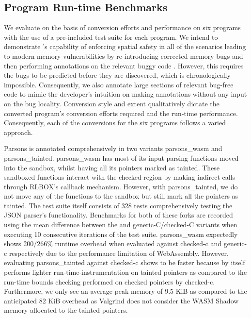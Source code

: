 \subsection{Program Run-time Benchmarks}
We evaluate \systemname on the basis of conversion efforts and performance on six programs with the use of a pre-included test suite for each program. We intend to demonstrate \systemname's capability of enforcing spatial safety in all of the scenarios leading to modern memory vulnerabilities by re-introducing corrected memory bugs and then performing \systemname annotations on the relevant buggy code . However, this requires the bugs to be predicted before they are discovered, which is chronologically impossible. Consequently, we also annotate large sections of relevant bug-free code to mimic the developer's intuition on making \systemname annotations without any input on the bug locality. Conversion style and extent qualitatively dictate the converted program's conversion efforts required and the run-time performance. Consequently, each of the conversions for the six programs follows a varied approach. 

Parsons is annotated comprehensively in two variants parsons\_wasm and parsons\_tainted. parsons\_wasm has most of its input parsing functions moved into the sandbox, whilst having all its pointers marked as tainted. These sandboxed functions interact with the checked region by making indirect calls through RLBOX's callback mechanism. However, with parsons\_tainted, we do not move any of the functions to the sandbox but still mark all the pointers as tainted. The test suite itself consists of 328 tests comprehensively testing the JSON parser's functionality. Benchmarks for both of these forks are recorded using the mean difference between the \systemname and generic-C/checked-C variants when executing 10 consecutive iterations of the test suite. parsons\_wasm expectedly shows 200/266\% runtime overhead when evaluated against checked-c and generic-c respectively due to the performance limitation of WebAssembly. However, evaluating parsons\_tainted against checked-c shows \systemname to be faster because \systemname by itself performs lighter run-time-instrumentation on tainted pointers as compared to the run-time bounds checking performed on checked pointers by checked-c. Furthermore, we only see an average peak memory of 9.5 KiB as compared to the anticipated 82 KiB overhead as Valgrind does not consider the WASM Shadow memory allocated to the tainted pointers.

